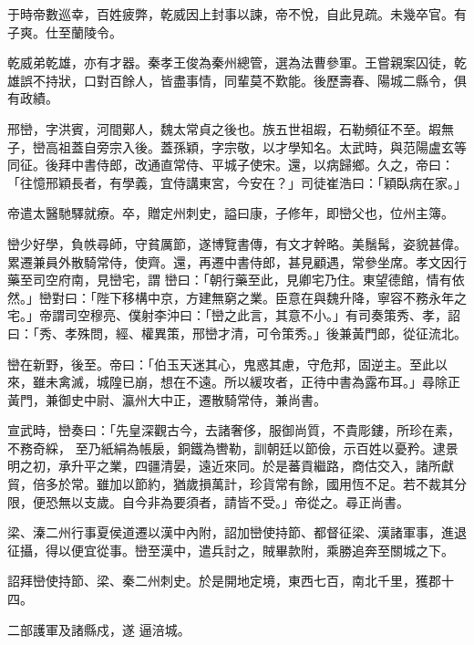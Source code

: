 \begin{pinyinscope}
 于時帝數巡幸，百姓疲弊，乾威因上封事以諫，帝不悅，自此見疏。未幾卒官。有子爽。仕至蘭陵令。



 乾威弟乾雄，亦有才器。秦孝王俊為秦州總管，選為法曹參軍。王嘗親案囚徒，乾雄誤不持狀，口對百餘人，皆盡事情，同輩莫不歎能。後歷壽春、陽城二縣令，俱有政績。



 邢巒，字洪賓，河間鄚人，魏太常貞之後也。族五世祖嘏，石勒頻征不至。嘏無子，巒高祖蓋自旁宗入後。蓋孫穎，字宗敬，以才學知名。太武時，與范陽盧玄等同征。後拜中書侍郎，改通直常侍、平城子使宋。還，以病歸鄉。久之，帝曰：「往憶邢穎長者，有學義，宜侍講東宮，今安在？」司徒崔浩曰：「穎臥病在家。」



 帝遣太醫馳驛就療。卒，贈定州刺史，謚曰康，子修年，即巒父也，位州主簿。



 巒少好學，負帙尋師，守貧厲節，遂博覽書傳，有文才幹略。美鬚髯，姿貌甚偉。累遷兼員外散騎常侍，使齊。還，再遷中書侍郎，甚見顧遇，常參坐席。孝文因行藥至司空府南，見巒宅，謂
 巒曰：「朝行藥至此，見卿宅乃住。東望德館，情有依然。」巒對曰：「陛下移構中京，方建無窮之業。臣意在與魏升降，寧容不務永年之宅。」帝謂司空穆亮、僕射李沖曰：「巒之此言，其意不小。」有司奏策秀、孝，詔曰：「秀、孝殊問，經、權異策，邢巒才清，可令策秀。」後兼黃門郎，從征流北。



 巒在新野，後至。帝曰：「伯玉天迷其心，鬼惑其慮，守危邦，固逆主。至此以來，雖未禽滅，城隍已崩，想在不遠。所以緩攻者，正待中書為露布耳。」尋除正黃門，兼御史中尉、瀛州大中正，遷散騎常侍，兼尚書。



 宣武時，巒奏曰：「先皇深觀古今，去諸奢侈，服御尚質，不貴彫鏤，所珍在素，不務奇綵，
 至乃紙絹為帳扆，銅鐵為轡勒，訓朝廷以節儉，示百姓以憂矜。逮景明之初，承升平之業，四疆清晏，遠近來同。於是蕃貢繼路，商估交入，諸所獻貿，倍多於常。雖加以節約，猶歲損萬計，珍貨常有餘，國用恆不足。若不裁其分限，便恐無以支歲。自今非為要須者，請皆不受。」帝從之。尋正尚書。



 梁、溱二州行事夏侯道遷以漢中內附，詔加巒使持節、都督征梁、漢諸軍事，進退征攝，得以便宜從事。巒至漢中，遣兵討之，賊畢款附，乘勝追奔至關城之下。



 詔拜巒使持節、梁、秦二州刺史。於是開地定境，東西七百，南北千里，獲郡十四。



 二部護軍及諸縣戍，遂
 逼涪城。




\end{pinyinscope}
